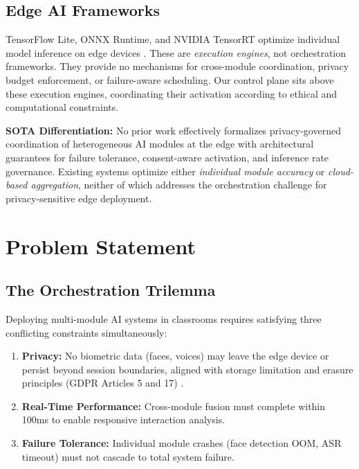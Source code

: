 \documentclass[conference]{IEEEtran}
\begin{document}
\subsection{Edge AI Frameworks}
TensorFlow Lite, ONNX Runtime, and NVIDIA TensorRT optimize individual model inference on edge devices \cite{b9, b10}. These are \textit{execution engines}, not orchestration frameworks. They provide no mechanisms for cross-module coordination, privacy budget enforcement, or failure-aware scheduling. Our control plane sits above these execution engines, coordinating their activation according to ethical and computational constraints.

\textbf{SOTA Differentiation:} No prior work effectively formalizes privacy-governed coordination of heterogeneous AI modules at the edge with architectural guarantees for failure tolerance, consent-aware activation, and inference rate governance. Existing systems optimize either \textit{individual module accuracy} or \textit{cloud-based aggregation}, neither of which addresses the orchestration challenge for privacy-sensitive edge deployment.

\section{Problem Statement}

\subsection{The Orchestration Trilemma}
Deploying multi-module AI systems in classrooms requires satisfying three conflicting constraints simultaneously:

\begin{enumerate}
    \item \textbf{Privacy:} No biometric data (faces, voices) may leave the edge device or persist beyond session boundaries, aligned with storage limitation and erasure principles (GDPR Articles 5 and 17) \cite{b4, b16}.
    \item \textbf{Real-Time Performance:} Cross-module fusion must complete within 100ms to enable responsive interaction analysis.
    \item \textbf{Failure Tolerance:} Individual module crashes (face detection OOM, ASR timeout) must not cascade to total system failure.
\end{enumerate}
\end{document}

